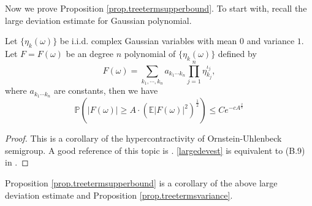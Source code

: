 Now we prove Proposition \ref{prop.treetermsupperbound}. To start with, recall the large deviation estimate for Gaussian polynomial.

\begin{lem}\label{lem.largedev}
Let $\{\eta_k(\omega)\}$ be i.i.d. complex Gaussian variables with mean $0$ and variance $1$. Let $F=F(\omega)$ be an degree $n$ polynomial of $\{\eta_k(\omega)\}$ defined by \begin{equation}\label{indp}
F(\omega)=\sum_{k_1,\cdots,k_n}a_{k_1\cdots k_n}\prod_{j=1}^n\eta_{k_j}^{\iota_j},
\end{equation} 
where $a_{k_1\cdots k_n}$ are constants, then we have 
\begin{equation}\label{largedevest}\mathbb{P}\left(|F(\omega)|\geq A\cdot \left(\mathbb{E}|F(\omega)|^2\right)^{\frac{1}{2}}\right)\leq Ce^{-cA^{\frac{2}{n}}}
\end{equation} 
\end{lem}
\begin{proof} This is a corollary of the hypercontractivity of Ornstein-Uhlenbeck semigroup. A good reference of this topic is \cite{oh2015ornstein}. \eqref{largedevest} is equivalent to (B.9) in \cite{oh2015ornstein}.
\end{proof}

Proposition \ref{prop.treetermsupperbound} is a corollary of the above large deviation estimate and Proposition \ref{prop.treetermsvariance}.


